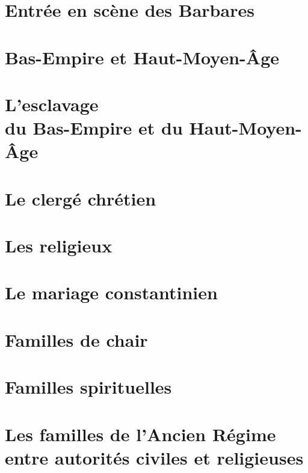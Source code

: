 \documentclass[12pt,french]{book}
\begin{document}
\chapter{Entrée en scène des Barbares}


\chapter{Bas-Empire et Haut-Moyen-Âge}


\chapter[L'esclavage du Bas-Empire et du Haut-Moyen-Âge]{L'esclavage\\du Bas-Empire et du Haut-Moyen-Âge}


\chapter{Le clergé chrétien}


\chapter{Les religieux}


\chapter{Le mariage constantinien}


\chapter{Familles de chair}


\chapter{Familles spirituelles}


\chapter[Les familles de l'Ancien Régime entre autorités civiles et religieuses]{Les familles de l'Ancien Régime\\entre autorités civiles et religieuses}

\end{document}
